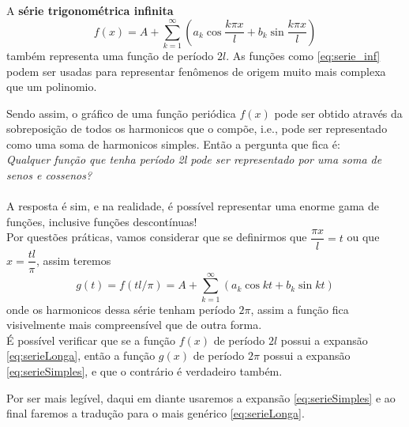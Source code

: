 A \textbf{série trigonométrica infinita}\\ 
\begin{equation}
    f(x) = A + \sum\limits_{k=1}^{\infty}(a_k\cos{\dfrac{k\pi x}{l}} + b_k\sin{\dfrac{k\pi x}{l}})
\label{eq:serie_inf}
\end{equation}
também representa uma função de período $2l$. As funções como \ref{eq:serie_inf} podem
ser usadas para representar fenômenos de origem muito mais complexa que um polinomio.

Sendo assim, o gráfico de uma função periódica $f(x)$ pode ser obtido através da 
sobreposição de todos os harmonicos que o compõe, i.e., pode ser representado
como uma soma de harmonicos simples.
Então a pergunta que fica é:\\
\textit{Qualquer função que tenha período 2l pode ser representado por uma soma de senos 
e cossenos?}\\
\\
A resposta é sim, e na realidade, é possível representar uma enorme gama de funções,
inclusive funções descontínuas!\\

Por questões práticas, vamos considerar que se definirmos que $\dfrac{\pi x}{l} = t$
ou que $x = \dfrac{tl}{\pi}$, assim teremos\\
\begin{equation}
    g(t) = f(tl/\pi) = A + \sum\limits_{k=1}^{\infty}(a_k\cos{kt} + b_k\sin{kt})
\label{eq:serieSimples}
\end{equation}
onde os harmonicos dessa série tenham período $2\pi$, assim a função fica visivelmente
mais compreensível que de outra forma.\\

É possível verificar que se a função $f(x)$ de período $2l$ possui a expansão 
\ref{eq:serieLonga}, então a função $g(x)$ de período $2\pi$ possui a expansão 
\ref{eq:serieSimples}, e que o contrário é verdadeiro também. 

Por ser mais legível, daqui em diante usaremos a expansão \ref{eq:serieSimples} 
e ao final faremos a tradução para o mais genérico \ref{eq:serieLonga}.\\